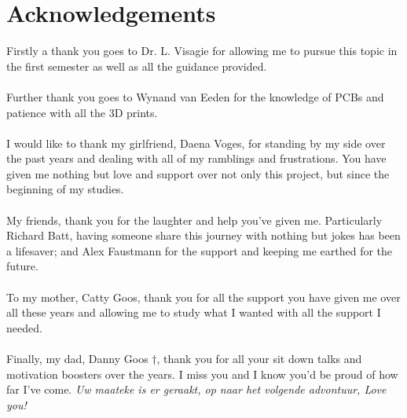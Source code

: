 \documentclass[12pt,a4paper]{report}
\begin{document}
\section*{Acknowledgements}
Firstly a thank you goes to Dr. L. Visagie for allowing me to pursue this topic in the first semester as well as all the guidance provided. \\\\
Further thank you goes to Wynand van Eeden for the knowledge of PCBs and patience with all the 3D prints.\\\\
I would like to thank my girlfriend, Daena Voges, for standing by my side over the past years and dealing with all of my ramblings and frustrations. You have given me nothing but love and support over not only this project, but since the beginning of my studies.\\\\
My friends, thank you for the laughter and help you've given me. Particularly Richard Batt, having someone share this journey with nothing but jokes has been a lifesaver; and Alex Faustmann for the support and keeping me earthed for the future.\\\\
To my mother, Catty Goos, thank you for all the support you have given me over all these years and allowing me to study what I wanted with all the support I needed.\\\\
Finally, my dad, Danny Goos $\dagger$, thank you for all your sit down talks and motivation boosters over the years. I miss you and I know you'd be proud of how far I've come. \textit{Uw maateke is er geraakt, op naar het volgende advontuur, Love you!}
\newpage

\end{document}
